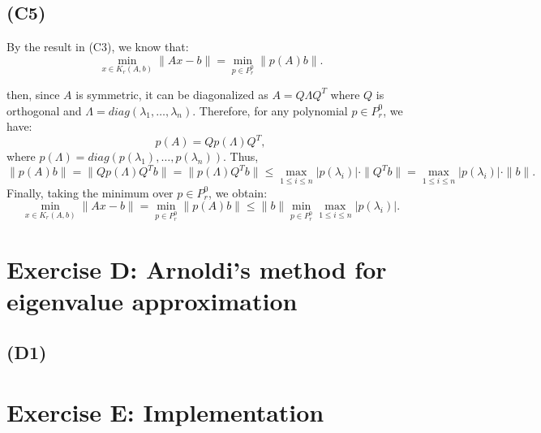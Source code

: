 \documentclass{article}
\begin{document}
\subsection*{(C5)}
By the result in (C3), we know that:
   \[
   \min_{x \in K_r(A, b)} \|Ax - b\| = \min_{p \in P_r^0} \|p(A)b\|.
   \]

then, since $ A $ is symmetric, it can be diagonalized as $ A = Q\Lambda Q^T$ where $ Q $ is orthogonal and $ \Lambda = diag(\lambda_1, \dots, \lambda_n) $.
Therefore, for any polynomial $ p \in P_r^0 $, we have:
   \[
   p(A) = Q p(\Lambda) Q^T,
   \]
   where $ p(\Lambda) = diag(p(\lambda_1), \dots, p(\lambda_n)) $.
 Thus,
   \[
   \|p(A) b\| = \|Q p(\Lambda) Q^T b\| = \|p(\Lambda) Q^T b\| \leq \max_{1 \leq i \leq n} |p(\lambda_i)| \cdot \|Q^T b\| = \max_{1 \leq i \leq n} |p(\lambda_i)| \cdot \|b\|.
   \]
Finally, taking the minimum over $ p \in P_r^0 $, we obtain:
   \[
   \min_{x \in K_r(A, b)} \|Ax - b\| = \min_{p \in P_r^0} \|p(A) b\| \leq \|b\| \min_{p \in P_r^0} \max_{1 \leq i \leq n} |p(\lambda_i)|.
   \]

\section{Exercise D: Arnoldi’s method for eigenvalue approximation}
\subsection*{(D1)}

\section{Exercise E: Implementation}
\end{document}

